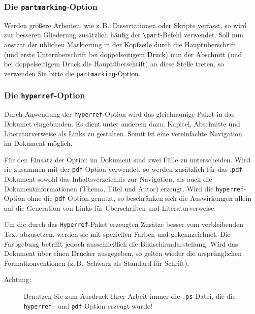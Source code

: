 \documentclass[english, trackchanges, hyperref, ngerman ,pdf, mp, mppdf]{wise}
\newcommand\code[1]{\texttt{#1}}
\newcommand\command[1]{\code{\textbackslash{}#1}}
\begin{document}
\subsubsection{Die \code{partmarking}-Option}

Werden größere Arbeiten, wie z.\,B.\ Dissertationen oder Skripte
verfasst, so wird zur besseren Gliederung zusätzlich häufig der \command{part}-Befehl
verwendet. Soll nun anstatt der üblichen Markierung in der Kopfzeile
durch die Hauptüberschrift (und erste Unterüberschrift bei doppelseitigem
Druck) nun der Abschnitt (und bei doppelseitigem Druck die Hauptüberschrift)
an diese Stelle treten, so verwenden Sie bitte die \code{partmarking}-Option.


\subsubsection{Die \code{hyperref}-Option}

Durch Anwendung der \code{hyperref}-Option wird das gleichnamige
Paket in das Dokumet eingebunden. Es dient unter anderem dazu, Kapitel,
Abschnitte und Literaturverweise als Links zu gestalten. Somit ist
eine vereinfachte Navigation im Dokument möglich.

Für den Einsatz der Option im Dokument sind zwei Fälle zu unterscheiden.
Wird sie zusammen mit der \code{pdf}-Option verwendet, so werden
zusätzlich für das .\code{pdf}-Dokument sowohl das Inhaltsverzeichnis
zur Navigation, als auch die Dokumentinformationen (Thema, Titel und
Autor) erzeugt. Wird die \code{hyperref}-Option ohne die \code{pdf}-Option
genutzt, so beschränken sich die Auswirkungen allein auf die Generation
von Links für Überschriften und Literaturverweise.

Um die durch das \code{Hyperref}-Paket erzeugten Zusätze besser
vom verbleibenden Text abzusetzen, werden sie mit speziellen Farben
und  gekennzeichnet. Die Farbgebung betrifft
jedoch ausschließlich die Bildschirmdarstellung. Wird das Dokument
über einen Drucker ausgegeben, so gelten wieder die ursprünglichen
Formatkonventionen (z.\,B.\ Schwarz als Standard für Schrift).

\begin{description}
\item [Achtung:]Benutzen Sie zum Ausdruck Ihrer Arbeit immer die \code{.ps}-Datei,
die  die \linebreak\code{hyperref-} und \code{pdf}-Option
erzeugt wurde!
\end{description}
\end{document}
